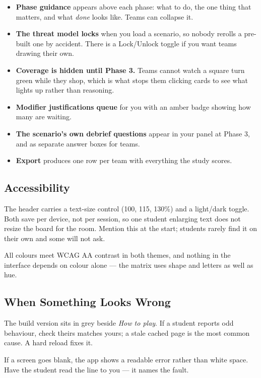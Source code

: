 \begin{itemize}
\item \textbf{Phase guidance} appears above each phase: what to do, the one thing
that matters, and what \emph{done} looks like. Teams can collapse it.
\item \textbf{The threat model locks} when you load a scenario, so nobody rerolls
a pre-built one by accident. There is a Lock/Unlock toggle if you want teams
drawing their own.
\item \textbf{Coverage is hidden until Phase 3.} Teams cannot watch a square turn
green while they shop, which is what stops them clicking cards to see what
lights up rather than reasoning.
\item \textbf{Modifier justifications queue} for you with an amber badge showing
how many are waiting.
\item \textbf{The scenario's own debrief questions} appear in your panel at Phase
3, and as separate answer boxes for teams.
\item \textbf{Export} produces one row per team with everything the study scores.
\end{itemize}

\subsection{Accessibility}

The header carries a text-size control (100, 115, 130\%) and a light/dark
toggle. Both save per device, not per session, so one student enlarging text does
not resize the board for the room. Mention this at the start; students rarely
find it on their own and some will not ask.

All colours meet WCAG AA contrast in both themes, and nothing in the interface
depends on colour alone --- the matrix uses shape and letters as well as hue.

\subsection{When Something Looks Wrong}

The build version sits in grey beside \emph{How to play}. If a student reports
odd behaviour, check theirs matches yours; a stale cached page is the most common
cause. A hard reload fixes it.

If a screen goes blank, the app shows a readable error rather than white space.
Have the student read the line to you --- it names the fault.

